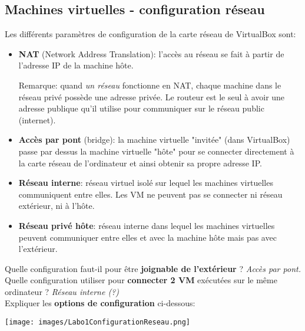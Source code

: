 \documentclass[class=article, crop=false]{standalone}
\begin{document}
\subsection{Machines virtuelles - configuration réseau}

Les différents paramètres de configuration de la carte réseau de VirtualBox sont:
\begin{itemize}

\item \textbf{NAT} (Network Address Translation): l'accès au réseau se fait à partir de l'adresse IP de la machine hôte.
\begin{example}
Remarque: quand \textit{un réseau} fonctionne en NAT, chaque machine dans le réseau privé possède une adresse privée. Le routeur est le seul à avoir une adresse publique qu'il utilise pour communiquer sur le réseau public (internet).
\end{example}

\item \textbf{Accès par pont} (bridge): la machine virtuelle "invitée" (dans VirtualBox) passe par dessus la machine virtuelle "hôte" pour se connecter directement à la carte réseau de l'ordinateur et ainsi obtenir sa propre adresse IP.

\item \textbf{Réseau interne}: réseau virtuel isolé sur lequel les machines virtuelles communiquent entre elles. Les VM ne peuvent pas se connecter ni réseau extérieur, ni à l'hôte.

\item \textbf{Réseau privé hôte}: réseau interne dans lequel les machines virtuelles peuvent communiquer entre elles et avec la machine hôte mais pas avec l'extérieur.

\end{itemize}
Quelle configuration faut-il pour être \textbf{joignable de l'extérieur} ? \textit{Accès par pont.} \\
Quelle configuration utiliser pour \textbf{connecter 2 VM} exécutées sur le même ordinateur ? \textit{Réseau interne (?)} \\
Expliquer les \textbf{options de configuration} ci-dessous:
\begin{center}
\texttt{[image: images/Labo1ConfigurationReseau.png]}
\end{center}
\end{document}

